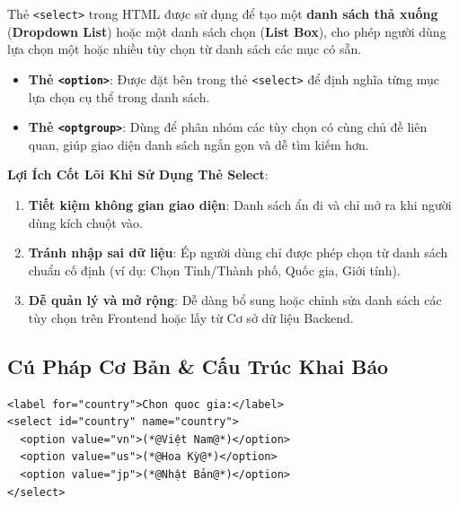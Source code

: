 \documentclass[11pt,oneside]{book}
\newcommand{\codeinline}[1]{\textcolor{accentOrange}{\texttt{#1}}}
\newcommand{\term}[1]{\textbf{\textcolor{primaryBlue}{#1}}}
\begin{document}
\begin{conceptBox}
Thẻ \codeinline{<select>} trong HTML được sử dụng để tạo một \textbf{danh sách thả xuống} (\term{Dropdown List}) hoặc một danh sách chọn (\term{List Box}), cho phép người dùng lựa chọn một hoặc nhiều tùy chọn từ danh sách các mục có sẵn.
\begin{itemize}[leftmargin=1.5em, itemsep=2pt, parsep=0pt]
    \item \textbf{Thẻ \codeinline{<option>}}: Được đặt bên trong thẻ \codeinline{<select>} để định nghĩa từng mục lựa chọn cụ thể trong danh sách.
    \item \textbf{Thẻ \codeinline{<optgroup>}}: Dùng để phân nhóm các tùy chọn có cùng chủ đề liên quan, giúp giao diện danh sách ngắn gọn và dễ tìm kiếm hơn.
\end{itemize}

\tcblower
\textbf{ Lợi Ích Cốt Lõi Khi Sử Dụng Thẻ Select}:
\begin{enumerate}[leftmargin=1.2em, itemsep=2pt, parsep=0pt]
    \item \textbf{Tiết kiệm không gian giao diện}: Danh sách ẩn đi và chỉ mở ra khi người dùng kích chuột vào.
    \item \textbf{Tránh nhập sai dữ liệu}: Ép người dùng chỉ được phép chọn từ danh sách chuẩn cố định (ví dụ: Chọn Tỉnh/Thành phố, Quốc gia, Giới tính).
    \item \textbf{Dễ quản lý và mở rộng}: Dễ dàng bổ sung hoặc chỉnh sửa danh sách các tùy chọn trên Frontend hoặc lấy từ Cơ sở dữ liệu Backend.
\end{enumerate}
\end{conceptBox}

\subsection{Cú Pháp Cơ Bản \& Cấu Trúc Khai Báo}

\begin{codeWindow}
\begin{lstlisting}[language=HTML5]
<label for="country">Chon quoc gia:</label>
<select id="country" name="country">
  <option value="vn">(*@Việt Nam@*)</option>
  <option value="us">(*@Hoa Kỳ@*)</option>
  <option value="jp">(*@Nhật Bản@*)</option>
</select>
\end{lstlisting}
\end{codeWindow}
\end{document}
